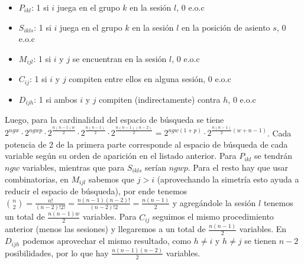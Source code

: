 \documentclass[letter, 10pt]{article}
\begin{document}
\begin{itemize}
    \item $P_{ikl}$: 1 si $i$ juega en el grupo $k$ en la sesión $l$, 0 e.o.c
    \item $S_{ikls}$: 1 si $i$ juega en el grupo $k$ en la sesión $l$ en la posición de asiento $s$, 0 e.o.c
    \item $M_{ijl}$: 1 si $i$ y $j$ se encuentran en la sesión $l$, 0 e.o.c
    \item $C_{ij}$: 1 si $i$ y $j$ compiten entre ellos en alguna sesión, 0 e.o.c
    \item $D_{ijh}$: 1 si ambos $i$ y $j$ compiten (indirectamente) contra $h$, 0 e.o.c  
\end{itemize}

Luego, para la cardinalidad del espacio de búsqueda se tiene $2^{ngw}\cdot 2^{ngwp}\cdot 2^{\frac{n(n-1)w}{2}} \cdot 2^{\frac{n(n-1)}{2}} \cdot 2^{\frac{n(n-1)(n-2)}{2}} = 2^{ngw(1+p)}\cdot2^{\frac{n(n-1)}{2}(w+n-1)}$. Cada potencia de 2 de la primera parte corresponde al espacio de búsqueda de cada variable según su orden de aparición en el listado anterior. Para $P_{ikl}$ se tendrán $ngw$ variables, mientras que para $S_{ikls}$ serían $ngwp$. Para el resto hay que usar combinatorias, en $M_{ijl}$ sabemos que $j>i$ (aprovechando la simetría esto ayuda a reducir el espacio de búsqueda), por ende tenemos $\binom{n}{2}=\frac{n!}{(n-2)!2!}=\frac{n(n-1)(n-2)!}{(n-2)!2} = \frac{n(n-1)}{2}$ y agregándole la sesión $l$ tenemos un total de $\frac{n(n-1)w}{2}$ variables. Para $C_{ij}$ seguimos el mismo procedimiento anterior (menos las sesiones) y llegaremos a un total de $\frac{n(n-1)}{2}$ variables. En $D_{ijh}$ podemos aprovechar el mismo resultado, como $h\neq i$ y $h\neq j$ se tienen $n-2$ posibilidades, por lo que hay $\frac{n(n-1)(n-2)}{2}$ variables.
\end{document}

